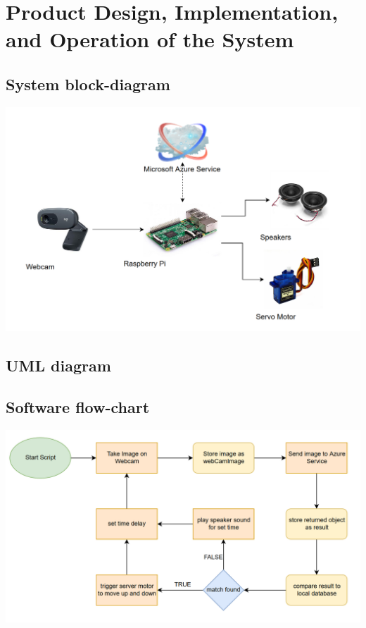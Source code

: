 \documentclass[a4paper,12pt]{article}
\begin{document}
\newpage
\section{Product Design, Implementation, and Operation of the System}
\subsection{System block-diagram}
\includegraphics[width = \linewidth]{../images/BlockDiagram.png}
\subsection{UML diagram}
\subsection{Software flow-chart}
\includegraphics[width = \linewidth]{../images/FlowChart.png}
\end{document}
